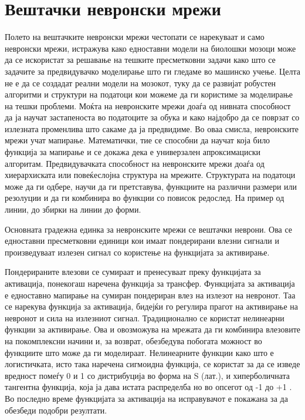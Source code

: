 \section{Вештачки невронски мрежи}
Полето на вештачките невронски мрежи \cite{schalkoff1997artificial} честопати се нарекуваат и само невронски мрежи, истражува како едноставни модели на биолошки мозоци може да се искористат за решавање на тешките пресметковни задачи како што се задачите за предвидувачко моделирање што ги гледаме во машинско учење. Целта не е да се создадат реални модели на мозокот, туку да се развијат робустен алгоритми и структури на податоци кои можеме да ги користиме за моделирање на тешки проблеми.
Моќта на невронските мрежи доаѓа од нивната способност да ја научат застапеноста во податоците за обука и како најдобро да се поврзат со излезната променлива што сакаме да ја предвидиме. Во оваа смисла, невронските мрежи учат мапирање. Математички, тие се способни да научат која било функција за мапирање и се докажа дека е универзален апроксимациски алгоритам.
Предвидувачката способност на невронските мрежи доаѓа од хиерархиската или повеќеслојна структура на мрежите. Структурата на податоци може да ги одбере, научи да ги претставува, функциите на различни размери или резолуции и да ги комбинира во функции со повисок редослед. На пример од линии, до збирки на линии до форми.

Основната градежна единка за невронските мрежи се вештачки неврони.
Ова се едноставни пресметковни единици кои имаат пондерирани влезни сигнали и произведуваат излезен сигнал со користење на функцијата за активирање.

Пондерираните влезови се сумираат и пренесуваат преку функцијата за активација, понекогаш наречена функција за трансфер.
Функцијата за активација е едноставно мапирање на сумиран пондериран влез на излезот на невронот. Таа се нарекува функција за активација, бидејќи го регулира прагот на активирање на невронот и сила на излезниот сигнал.
Традиционално се користат нелинеарни функции за активирање. Ова и овозможува на мрежата да ги комбинира влезовите на покомплексни начини и, за возврат, обезбедува побогата можност во функциите што може да ги моделираат. Нелинеарните функции како што е логистичката, исто така наречена сигмоидна функција, се користат за да се изведе вредност помеѓу 0 и 1 со дистрибуција во форма на S (лат.), и хиперболичната тангентна функција, која ја дава истата распределба но во опсегот од -1 до +1 .
Во последно време функцијата за активација на исправувачот е покажана за да обезбеди подобри резултати.

